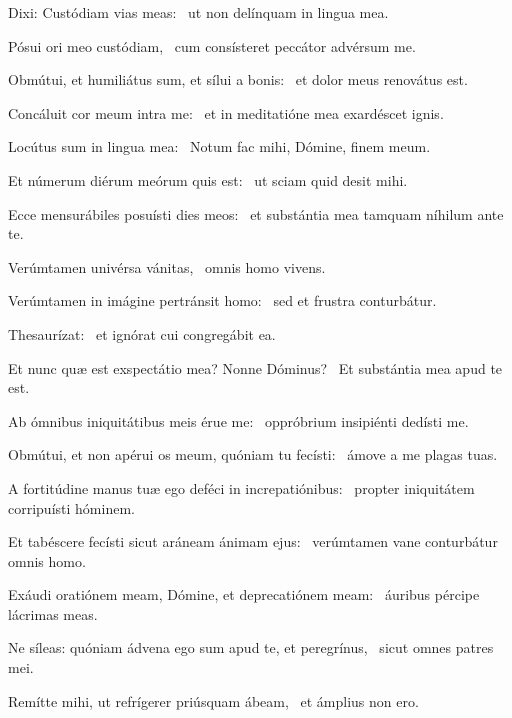 \item Dixi: Custódiam vias meas:~\psstar{} ut non delínquam in lingua mea.

\item Pósui ori meo custódiam,~\psstar{} cum consísteret peccátor advérsum me.

\item Obmútui, et humiliátus sum, et sílui a bonis:~\psstar{} et dolor meus renovátus est.

\item Concáluit cor meum intra me:~\psstar{} et in meditatióne mea exardéscet ignis.

\item Locútus sum in lingua mea:~\psstar{} Notum fac mihi, Dómine, finem meum.

\item Et númerum diérum meórum quis est:~\psstar{} ut sciam quid desit mihi.

\item Ecce mensurábiles posuísti dies meos:~\psstar{} et substántia mea tamquam níhilum ante te.

\item Verúmtamen univérsa vánitas,~\psstar{} omnis homo vivens.

\item Verúmtamen in imágine pertránsit homo:~\psstar{} sed et frustra conturbátur.

\item Thesaurízat:~\psstar{} et ignórat cui congregábit ea.

\item Et nunc quæ est exspectátio mea? Nonne Dóminus?~\psstar{} Et substántia mea apud te est.

\item Ab ómnibus iniquitátibus meis érue me:~\psstar{} oppróbrium insipiénti dedísti me.

\item Obmútui, et non apérui os meum, quóniam tu fecísti:~\psstar{} ámove a me plagas tuas.

\item A fortitúdine manus tuæ ego deféci in increpatiónibus:~\psstar{} propter iniquitátem corripuísti hóminem.

\item Et tabéscere fecísti sicut aráneam ánimam ejus:~\psstar{} verúmtamen vane conturbátur omnis homo.

\item Exáudi oratiónem meam, Dómine, et deprecatiónem meam:~\psstar{} áuribus pércipe lácrimas meas.

\item Ne síleas: quóniam ádvena ego sum apud te, et peregrínus,~\psstar{} sicut omnes patres mei.

\item Remítte mihi, ut refrígerer priúsquam ábeam,~\psstar{} et ámplius non ero.
